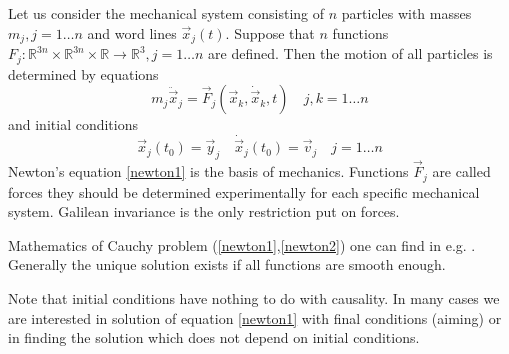 \documentclass[11pt]{report}
\begin{document}
Let us consider the mechanical system consisting of $n$ particles 
with masses $m_j,j=1\ldots n$ and word lines $\vec x_j(t)$.
Suppose that $n$ functions  
$F_j:\mathbb{R}^{3 n}\times\mathbb{R}^{3 n}\times\mathbb{R}\rightarrow\mathbb{R}^3,j=1\ldots n$ 
are defined. Then the motion of all particles is determined by equations
\begin{equation}
    m_j \ddot \vec x_j=\vec F_j(\vec x_k,\dot \vec x_k,t) \quad j,k=1\ldots n \label {newton1}
\end{equation}
and initial conditions
\begin{equation}
    \vec x_j(t_0)=\vec y_j\quad\dot \vec x_j(t_0)=\vec v_j  \quad j=1\ldots n \label {newton2}
\end{equation}
Newton's equation \eqref{newton1} is  the basis of mechanics. Functions $\vec F_j$
are called forces they should be determined experimentally for each specific mechanical system.
Galilean invariance is the only restriction put on forces.

Mathematics of  Cauchy problem (\ref{newton1},\ref{newton2}) 
one can find in e.g. \cite{arnold-ode}. Generally the unique solution exists if
all functions are smooth enough.

Note that initial conditions have nothing to do with causality. In many cases we are
interested in solution of equation \eqref{newton1} with final 
conditions (aiming) or in finding the solution which does not 
depend on initial conditions.
\printbibliography[
heading=bibintoc,
title={References}
] 
\clearpage
\end{document}
